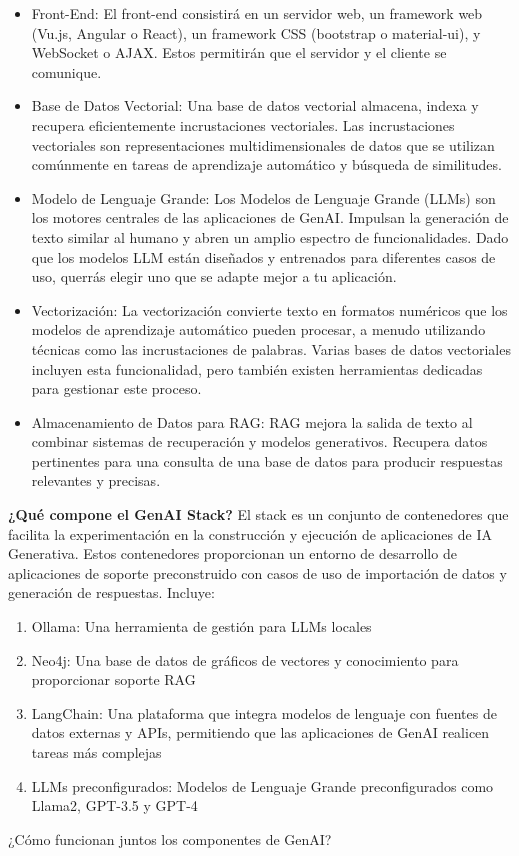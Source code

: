 \documentclass{article}
\begin{document}
\begin{itemize}
	
	\item Front-End: El front-end consistirá en un servidor web, un framework web (Vu.js, Angular o React), un framework CSS (bootstrap o material-ui), y WebSocket o AJAX. Estos permitirán que el servidor y el cliente se comunique.
	
	\item Base de Datos Vectorial: Una base de datos vectorial almacena, indexa y recupera eficientemente incrustaciones vectoriales. Las incrustaciones vectoriales son representaciones multidimensionales de datos que se utilizan comúnmente en tareas de aprendizaje automático y búsqueda de similitudes.

	\item Modelo de Lenguaje Grande: Los Modelos de Lenguaje Grande (LLMs) son los motores centrales de las aplicaciones de GenAI. Impulsan la generación de texto similar al humano y abren un amplio espectro de funcionalidades. Dado que los modelos LLM están diseñados y entrenados para diferentes casos de uso, querrás elegir uno que se adapte mejor a tu aplicación.

	\item Vectorización: La vectorización convierte texto en formatos numéricos que los modelos de aprendizaje automático pueden procesar, a menudo utilizando técnicas como las incrustaciones de palabras. Varias bases de datos vectoriales incluyen esta funcionalidad, pero también existen herramientas dedicadas para gestionar este proceso.

	\item Almacenamiento de Datos para RAG: RAG mejora la salida de texto al combinar sistemas de recuperación y modelos generativos. Recupera datos pertinentes para una consulta de una base de datos para producir respuestas relevantes y precisas.
\end{itemize}

\textbf{¿Qué compone el GenAI Stack?}
El stack es un conjunto de contenedores que facilita la experimentación en la construcción y ejecución de aplicaciones de IA Generativa. Estos contenedores proporcionan un entorno de desarrollo de aplicaciones de soporte preconstruido con casos de uso de importación de datos y generación de respuestas. Incluye:
\begin{enumerate}
	\item Ollama: Una herramienta de gestión para LLMs locales
	\item Neo4j: Una base de datos de gráficos de vectores y conocimiento para proporcionar soporte RAG
	\item LangChain: Una plataforma que integra modelos de lenguaje con fuentes de datos externas y APIs, permitiendo que las aplicaciones de GenAI realicen tareas más complejas
	\item LLMs preconfigurados: Modelos de Lenguaje Grande preconfigurados como Llama2, GPT-3.5 y GPT-4
\end{enumerate}
¿Cómo funcionan juntos los componentes de GenAI?
\end{document}
